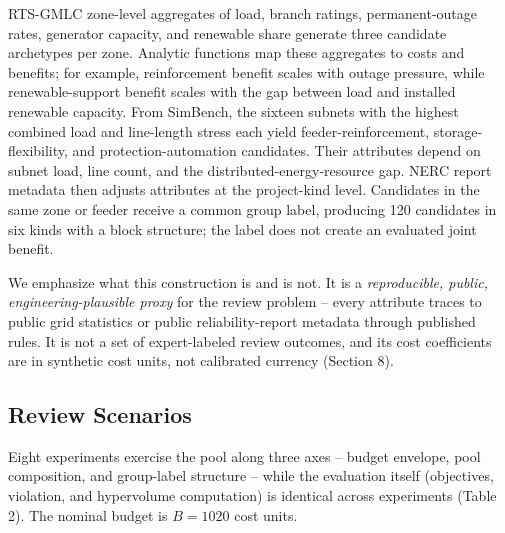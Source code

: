 \documentclass[applsci,article,submit,moreauthors]{Definitions/mdpi}
\begin{document}
RTS-GMLC zone-level aggregates of load, branch ratings, permanent-outage rates, generator capacity, and renewable share generate three candidate archetypes per zone. Analytic functions map these aggregates to costs and benefits; for example, reinforcement benefit scales with outage pressure, while renewable-support benefit scales with the gap between load and installed renewable capacity. From SimBench, the sixteen subnets with the highest combined load and line-length stress each yield feeder-reinforcement, storage-flexibility, and protection-automation candidates. Their attributes depend on subnet load, line count, and the distributed-energy-resource gap. NERC report metadata then adjusts attributes at the project-kind level. Candidates in the same zone or feeder receive a common group label, producing 120 candidates in six kinds with a block structure; the label does not create an evaluated joint benefit.

We emphasize what this construction is and is not. It is a \emph{reproducible, public, engineering-plausible proxy} for the review problem -- every attribute traces to public grid statistics or public reliability-report metadata through published rules. It is not a set of expert-labeled review outcomes, and its cost coefficients are in synthetic cost units, not calibrated currency (Section 8).

\subsection{Review Scenarios}\label{review-scenarios}

Eight experiments exercise the pool along three axes -- budget envelope, pool composition, and group-label structure -- while the evaluation itself (objectives, violation, and hypervolume computation) is identical across experiments (Table 2). The nominal budget is \(B = 1020\) cost units.
\end{document}
